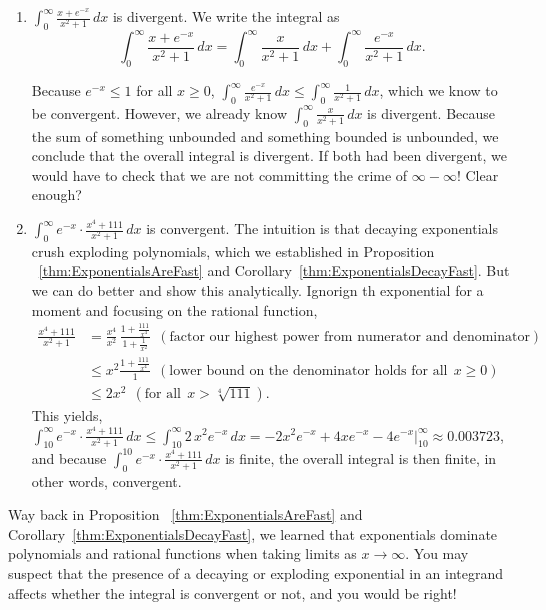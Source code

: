 \begin{enumerate}
    \item $\int_0^\infty \frac{x + e^{-x}}{x^2 + 1} \, dx$ is divergent. We write the integral as 
    $$\int_0^\infty \frac{x + e^{-x}}{x^2 + 1} \, dx = \int_0^\infty \frac{x }{x^2 + 1} \, dx + \int_0^\infty \frac{e^{-x}}{x^2 + 1} \, dx.$$

    Because $e^{-x} \le 1$ for all $x \ge 0$,  $\int_0^\infty \frac{e^{-x}}{x^2 + 1} \, dx \le \int_0^\infty \frac{1}{x^2 + 1} \, dx$, which we know to be convergent. However, we already know $\int_0^\infty \frac{x }{x^2 + 1} \, dx$ is divergent. Because the sum of something unbounded and something bounded is unbounded, we conclude that the overall integral is divergent. If both had been divergent, we would have to check that we are not committing the crime of $\infty - \infty$! Clear enough?

   \item $\int_0^\infty e^{-x} \cdot\frac{x^4 + 111}{x^2 + 1} \, dx$ is convergent. The intuition is that decaying exponentials crush exploding polynomials, which we established in Proposition ~\ref{thm:ExponentialsAreFast} and Corollary~\ref{thm:ExponentialsDecayFast}. But we can do better and show this analytically. Ignorign th exponential for a moment and focusing on the rational function, 
  \begin{align*}
      \frac{x^4 + 111}{x^2 + 1} &= \frac{x^4}{x^2} \,  \frac{1 + \frac{111}{x^4}}{1 + \frac{1}{x^2}} ~~(\text{factor our highest power from numerator and denominator})\\[1em] 
      &\le x^2 \frac{1 + \frac{111}{x^4}}{1}  ~~(\text{lower bound on the denominator holds for all}~~ x\ge 0)\\[1em] 
      &\le 2x^2  ~~(\text{for all}~~x>\sqrt[4]{111}).
  \end{align*} 
 This yields,  
  $\int_{10}^\infty e^{-x} \cdot\frac{x^4 + 111}{x^2 + 1} \, dx \le \int_{10}^\infty 2 \, x^2 e^{-x} \, dx = -2x^2e^{-x} + 4xe^{-x} - 4e^{-x} \Bigg|_{10}^\infty \approx 0.003723 $,
   and because   $\int_0^{10} e^{-x} \cdot\frac{x^4 + 111}{x^2 + 1} \, dx$ is finite, the overall integral is then finite, in other words, convergent.
 \end{enumerate}
\Qed

\bigskip 

Way back in Proposition ~\ref{thm:ExponentialsAreFast} and Corollary~\ref{thm:ExponentialsDecayFast}, we learned that exponentials dominate polynomials and rational functions when taking limits as $x \to \infty$. You may suspect that the presence of a decaying or exploding exponential in an integrand affects whether the integral is convergent or not, and you would be right! 

